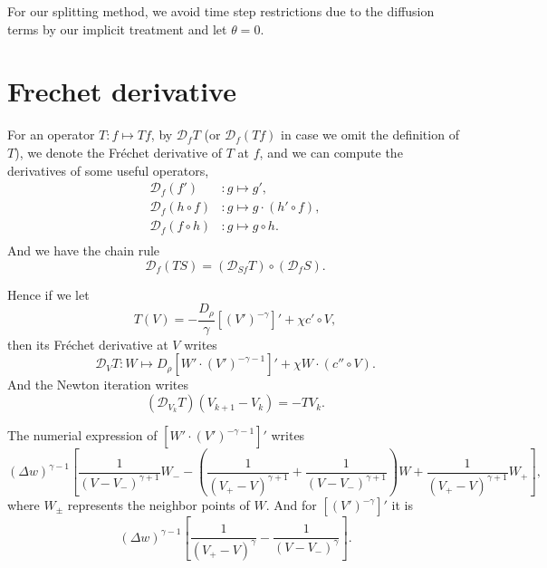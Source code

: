 \documentclass{article}
\newcommand{\frender}{\mathcal D}
\begin{document}
  For our splitting method, we avoid time step restrictions due to the diffusion terms by our
  implicit treatment and let $\theta = 0$.

  \section{Frechet derivative}
  For an operator $T: f\mapsto Tf$, by $\frender_fT$ (or $\frender_f(Tf)$ in case we omit the definition
  of $T$), we denote the Fr\'echet derivative
  of $T$ at $f$, and we can compute the derivatives of some useful operators, 
  \[
    \begin{aligned}
      \frender_f(f')      &:g\mapsto g', \\
      \frender_f(h\circ f)&:g\mapsto g\cdot(h'\circ f), \\
      \frender_f(f\circ h)&:g\mapsto g\circ h. \\
    \end{aligned}
  \]
  And we have the chain rule
  \[
    \frender_f(TS) = \left(\frender_{Sf}T\right) \circ \left(\frender_fS\right).
  \]

  Hence if we let
  \[
    T(V) = -\frac{D_\rho}{\gamma}\left[(V')^{-\gamma}\right]'
    + \chi c'\circ V,
  \]
  then its Fr\'echet derivative at $V$ writes
  \[
    \frender_V T: W\mapsto
    D_\rho\left[W'\cdot (V')^{-\gamma - 1}\right]' + \chi W\cdot(c''\circ V).
  \]
  And the Newton iteration writes
  \[
    (\frender_{V_k} T)(V_{k + 1} - V_k) = - TV_k.
  \]

  The numerial expression of $[W'\cdot(V')^{-\gamma - 1}]'$ writes
  \[
    (\Delta w)^{\gamma - 1}
    \left[
      \frac{1}{(V - V_-)^{\gamma + 1}}W_-
      -\left(\frac{1}{(V_+ - V)^{\gamma + 1}} + \frac{1}{(V - V_-)^{\gamma + 1}}\right)W
      +\frac{1}{(V_+ - V)^{\gamma + 1}}W_+
    \right],
  \]
  where $W_{\pm}$ represents the neighbor points of $W$.
  And for $[(V')^{-\gamma}]'$ it is
  \[
    (\Delta w)^{\gamma - 1}
    \left[
      \frac1{(V_+ - V)^{\gamma}} - \frac1{(V - V_-)^\gamma}
    \right].
  \]
\end{document}
